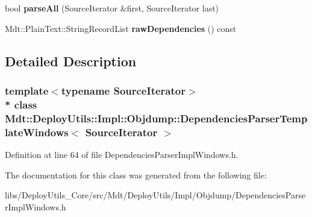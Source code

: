 \begin{DoxyCompactItemize}
\item 
bool {\bfseries parse\+All} (Source\+Iterator \&first, Source\+Iterator last)\hypertarget{class_mdt_1_1_deploy_utils_1_1_impl_1_1_objdump_1_1_dependencies_parser_template_windows_a9ab5678a8ea35f3e1899d920a1fcef0a}{}\label{class_mdt_1_1_deploy_utils_1_1_impl_1_1_objdump_1_1_dependencies_parser_template_windows_a9ab5678a8ea35f3e1899d920a1fcef0a}

\item 
Mdt\+::\+Plain\+Text\+::\+String\+Record\+List {\bfseries raw\+Dependencies} () const \hypertarget{class_mdt_1_1_deploy_utils_1_1_impl_1_1_objdump_1_1_dependencies_parser_template_windows_ab86d0dc40db5ded9a286f2d6bf3851c1}{}\label{class_mdt_1_1_deploy_utils_1_1_impl_1_1_objdump_1_1_dependencies_parser_template_windows_ab86d0dc40db5ded9a286f2d6bf3851c1}

\end{DoxyCompactItemize}


\subsection{Detailed Description}
\subsubsection*{template$<$typename Source\+Iterator$>$\\*
class Mdt\+::\+Deploy\+Utils\+::\+Impl\+::\+Objdump\+::\+Dependencies\+Parser\+Template\+Windows$<$ Source\+Iterator $>$}



Definition at line 64 of file Dependencies\+Parser\+Impl\+Windows.\+h.



The documentation for this class was generated from the following file\+:\begin{DoxyCompactItemize}
\item 
libs/\+Deploy\+Utils\+\_\+\+Core/src/\+Mdt/\+Deploy\+Utils/\+Impl/\+Objdump/Dependencies\+Parser\+Impl\+Windows.\+h\end{DoxyCompactItemize}

